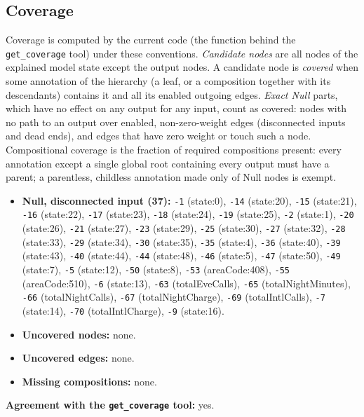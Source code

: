 \begin{drafted}
\subsection{Coverage}\label{app:churn100-s4-c2:coverage}
Coverage is computed by the current code (the function behind the \texttt{get\_coverage} tool) under these conventions. \emph{Candidate nodes} are all nodes of the explained model state except the output nodes. A candidate node is \emph{covered} when some annotation of the hierarchy (a leaf, or a composition together with its descendants) contains it and all its enabled outgoing edges. \emph{Exact Null} parts, which have no effect on any output for any input, count as covered: nodes with no path to an output over enabled, non-zero-weight edges (disconnected inputs and dead ends), and edges that have zero weight or touch such a node. Compositional coverage is the fraction of required compositions present: every annotation except a single global root containing every output must have a parent; a parentless, childless annotation made only of Null nodes is exempt.

\begin{itemize}
\item \textbf{Null, disconnected input (37):} \texttt{-1} (state:0), \texttt{-14} (state:20), \texttt{-15} (state:21), \texttt{-16} (state:22), \texttt{-17} (state:23), \texttt{-18} (state:24), \texttt{-19} (state:25), \texttt{-2} (state:1), \texttt{-20} (state:26), \texttt{-21} (state:27), \texttt{-23} (state:29), \texttt{-25} (state:30), \texttt{-27} (state:32), \texttt{-28} (state:33), \texttt{-29} (state:34), \texttt{-30} (state:35), \texttt{-35} (state:4), \texttt{-36} (state:40), \texttt{-39} (state:43), \texttt{-40} (state:44), \texttt{-44} (state:48), \texttt{-46} (state:5), \texttt{-47} (state:50), \texttt{-49} (state:7), \texttt{-5} (state:12), \texttt{-50} (state:8), \texttt{-53} (areaCode:408), \texttt{-55} (areaCode:510), \texttt{-6} (state:13), \texttt{-63} (totalEveCalls), \texttt{-65} (totalNightMinutes), \texttt{-66} (totalNightCalls), \texttt{-67} (totalNightCharge), \texttt{-69} (totalIntlCalls), \texttt{-7} (state:14), \texttt{-70} (totalIntlCharge), \texttt{-9} (state:16).
\item \textbf{Uncovered nodes:} none.
\item \textbf{Uncovered edges:} none.
\item \textbf{Missing compositions:} none.
\end{itemize}
\noindent\textbf{Agreement with the \texttt{get\_coverage} tool:} yes.


\end{drafted}
